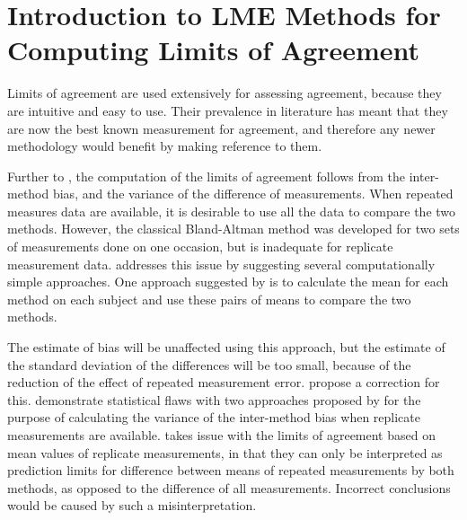 \documentclass[12pt, a4paper]{report}
\theoremstyle{plain}
\theoremstyle{definition}
\theoremstyle{remark}
\begin{document}
	
	
	
	\section{Introduction to LME Methods for Computing Limits of Agreement}
	
	Limits of agreement are used extensively for assessing agreement, because they are intuitive and easy to use. Their prevalence in literature has meant that they are now the best known measurement for agreement, and therefore any newer methodology would benefit by making reference to them.
	
	Further to \citet{BA86}, the computation of the limits of agreement follows from the inter-method bias, and the variance of the difference of measurements. When repeated measures data are available, it is desirable to use all the data to compare the two methods. However, the classical Bland-Altman method was developed for two sets of measurements done on one occasion, but is inadequate for replicate measurement data. \citet{BA99} addresses this issue by suggesting several computationally simple approaches.  One approach suggested by \citet{BA99} is to calculate
	the mean for each method on each subject and use these pairs of means to compare the two methods. 
	
	The estimate of bias will be unaffected using this approach, but the estimate of the standard deviation of the differences will be too small, because of the reduction of the effect of repeated measurement error. \citet{BA99} propose a correction for this. \citet{BXC2008} demonstrate statistical flaws with two approaches proposed by \citet{BA99} for the purpose of calculating the variance of the inter-method bias when replicate measurements are available.
	\citet{BXC2008} takes issue with the limits of agreement based on
	mean values of replicate measurements, in that they can only be interpreted as prediction
	limits for difference between means of repeated measurements by
	both methods, as opposed to the difference of all measurements.
	Incorrect conclusions would be caused by such a misinterpretation.
	
\end{document}
